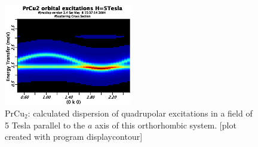 \begin{figure}[hb]%
\begin{center}\leavevmode
\includegraphics[angle=0, width=0.5\textwidth]{figsrc/prcu2_0k0_5T.eps}
\end{center}
\caption{PrCu$_2$: calculated dispersion of quadrupolar excitations in a field of 5 Tesla parallel to the $a$ axis %
of this orthorhombic system.
[plot created with program {\prg displaycontour}]}
\label{qintensity}
\end{figure}

\clearpage
